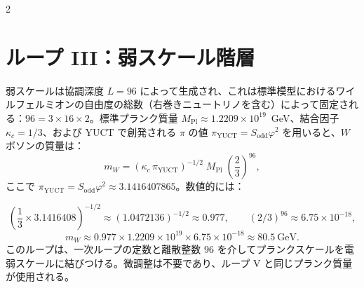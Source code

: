\documentclass[12pt,a4paper]{article}
\begin{document}
\begin{multicols}{2}
		\section{ループ III：弱スケール階層}
		
		弱スケールは協調深度 \(L = 96\) によって生成され、これは標準模型におけるワイルフェルミオンの自由度の総数（右巻きニュートリノを含む）によって固定される：\(96 = 3 \times 16 \times 2\)。標準プランク質量 \(M_{\mathrm{Pl}} \approx 1.2209 \times 10^{19}\)~GeV、結合因子 \(\kappa_c = 1/3\)、および YUCT で創発される \(\pi\) の値 \(\pi_{\mathrm{YUCT}} = S_{\mathrm{odd}}\varphi^2\) を用いると、\(W\) ボソンの質量は：
		\begin{equation}
			\boxed{m_W = \left( \kappa_c \, \pi_{\mathrm{YUCT}} \right)^{-1/2} \; M_{\mathrm{Pl}} \; \left( \frac{2}{3} \right)^{96}},
		\end{equation}
		ここで \(\pi_{\mathrm{YUCT}} = S_{\mathrm{odd}}\varphi^2 \approx 3.1416407865\)。数値的には：
	\end{multicols}
	\small
	\[
	\left( \frac{1}{3} \times 3.1416408 \right)^{-1/2} \approx (1.0472136)^{-1/2} \approx 0.977,\qquad 
	(2/3)^{96} \approx 6.75 \times 10^{-18},
	\]
	\[
	m_W \approx 0.977 \times 1.2209 \times 10^{19} \times 6.75 \times 10^{-18} \approx 80.5\ \text{GeV}.
	\]
	このループは、一次ループの定数と離散整数 \(96\) を介してプランクスケールを電弱スケールに結びつける。微調整は不要であり、ループ V と同じプランク質量が使用される。
\end{document}
